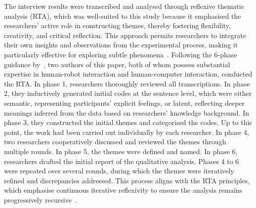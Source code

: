 The interview results were transcribed and analysed through reflexive thematic analysis (RTA), which was well-suited to this study because it emphasised the researchers’ active role in constructing themes, thereby fostering flexibility, creativity, and critical reflection. This approach permits researchers to integrate their own insights and observations from the experimental process, making it particularly effective for exploring subtle phenomena~\cite{braun2023doing}. Following the 6-phase guidance by~\cite{braun2006using}, two authors of this paper, both of whom possess substantial expertise in human-robot interaction and human-computer interaction, conducted the RTA. In phase 1, researchers thoroughly reviewed all transcriptions. In phase 2, they inductively generated initial codes at the sentence level, which were either semantic, representing participants' explicit feelings, or latent, reflecting deeper meanings inferred from the data based on researchers' knowledge background. In phase 3, they constructed the initial themes and categorised the codes. Up to this point, the work had been carried out individually by each researcher. In phase 4, two researchers cooperatively discussed and reviewed the themes through multiple rounds. In phase 5, the themes were defined and named. In phase 6, researchers drafted the initial report of the qualitative analysis. Phases 4 to 6 were repeated over several rounds, during which the themes were iteratively refined and discrepancies addressed. This process aligns with the RTA principles, which emphasise continuous iterative reflexivity to ensure the analysis remains progressively recursive~\cite{terry2017thematic}.

